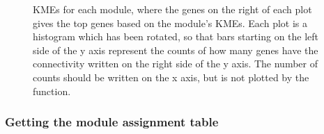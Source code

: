 \documentclass[
  letterpaper,
  DIV=11,
  numbers=noendperiod]{scrartcl}
\begin{document}
\begin{figure}[H]


\caption{\label{fig-kme}KMEs for each module, where the genes on the
right of each plot gives the top genes based on the module's KMEs. Each
plot is a histogram which has been rotated, so that bars starting on the
left side of the y axis represent the counts of how many genes have the
connectivity written on the right side of the y axis. The number of
counts should be written on the x axis, but is not plotted by the
function.}

\end{figure}%

\subsubsection{Getting the module assignment
table}\label{getting-the-module-assignment-table}
\end{document}
